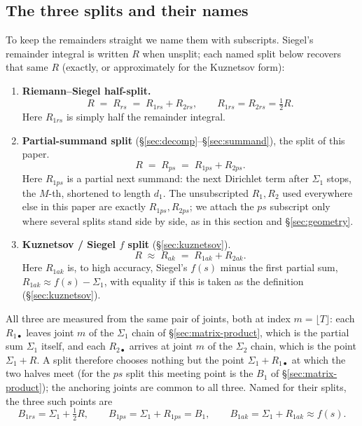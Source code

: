 \documentclass[11pt]{article}
\theoremstyle{definition}
\begin{document}
\subsection{The three splits and their names}\label{sec:remainders-summary}

To keep the remainders straight we name them
with subscripts. Siegel's remainder integral is written $R$ when unsplit; each
named split below recovers that same $R$ (exactly, or approximately for the
Kuznetsov form):
\begin{enumerate}
\item \textbf{Riemann--Siegel half-split.}
\[
R \;=\; R_{rs} \;=\; R_{1rs}+R_{2rs},
\qquad
R_{1rs}=R_{2rs}=\tfrac12 R.
\]
Here $R_{1rs}$ is simply half the remainder integral.
\item \textbf{Partial-summand split} (\S\ref{sec:decomp}--\S\ref{sec:summand}),
the split of this paper.
\[
R \;=\; R_{ps} \;=\; R_{1ps}+R_{2ps}.
\]
Here $R_{1ps}$ is a partial next summand: the next Dirichlet term after
$\Sigma_1$ stops, the $M$-th, shortened to length $d_1$. The unsubscripted
$R_{1},R_{2}$ used everywhere else in this paper are exactly
$R_{1ps},R_{2ps}$; we attach the $ps$ subscript only where several splits
stand side by side, as in this section and \S\ref{sec:geometry}.
\item \textbf{Kuznetsov / Siegel $f$ split} (\S\ref{sec:kuznetsov}).
\[
R \;\approx\; R_{ak} \;=\; R_{1ak}+R_{2ak}.
\]
Here $R_{1ak}$ is, to high accuracy, Siegel's $f(s)$ minus the first
partial sum, $R_{1ak}\approx f(s)-\Sigma_1$, with equality if this is
taken as the definition (\S\ref{sec:kuznetsov}).
\end{enumerate}

All three are measured from the same pair of joints, both at index
$m=\lfloor T\rfloor$: each $R_{1\bullet}$ leaves joint $m$ of the $\Sigma_1$
chain of \S\ref{sec:matrix-product}, which is the partial sum $\Sigma_1$
itself, and each $R_{2\bullet}$
arrives at joint $m$ of the $\Sigma_2$ chain, which is the point $\Sigma_1+R$.
A split therefore chooses nothing but the point $\Sigma_1+R_{1\bullet}$ at which
the two halves meet (for the $ps$ split this meeting point is the $B_1$ of
\S\ref{sec:matrix-product}); the anchoring joints are common to all three.
Named for their splits, the three such points are
\begin{equation}\label{eq:B1-three}
B_{1rs}=\Sigma_1+\tfrac12R,
\qquad
B_{1ps}=\Sigma_1+R_{1ps}=B_1,
\qquad
B_{1ak}=\Sigma_1+R_{1ak}\approx f(s).
\end{equation}
\end{document}
